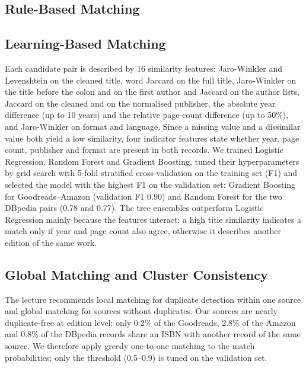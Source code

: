 \documentclass[runningheads]{llncs}
\begin{document}
\subsection{Rule-Based Matching}\label{sec:rules}

\subsection{Learning-Based Matching}\label{sec:ml}
Each candidate pair is described by 16 similarity features: Jaro-Winkler and
Levenshtein on the cleaned title, word Jaccard on the full title, Jaro-Winkler
on the title before the colon and on the first author and Jaccard on the author lists,
Jaccard on the cleaned and on the normalised publisher, the absolute year
difference (up to 10 years) and the relative page-count difference (up to
50\%), and Jaro-Winkler on format and language. Since a missing value and a
dissimilar value both yield a low similarity, four indicator features state
whether year, page count, publisher and format are present in both records.
We trained Logistic Regression, Random Forest and Gradient Boosting, tuned their
hyperparameters by grid search with 5-fold stratified cross-validation on the
training set (F1) and selected the model with the highest F1 on the validation
set: Gradient Boosting for Goodreads--Amazon (validation F1 0.90) and Random
Forest for the two DBpedia pairs (0.78 and 0.77). The tree ensembles outperform
Logistic Regression mainly because the features interact: a high title
similarity indicates a match only if year and page count also agree, otherwise
it describes another edition of the same work.

\subsection{Global Matching and Cluster Consistency}\label{sec:global}
The lecture recommends local matching for duplicate detection within one source
and global matching for sources without duplicates. Our sources are nearly
duplicate-free at edition level: only 0.2\% of the Goodreads, 2.8\% of the
Amazon and 0.8\% of the DBpedia records share an ISBN with another record of
the same source. We therefore apply greedy one-to-one matching to the match
probabilities; only the threshold (0.5--0.9) is tuned on the validation set.
\end{document}
